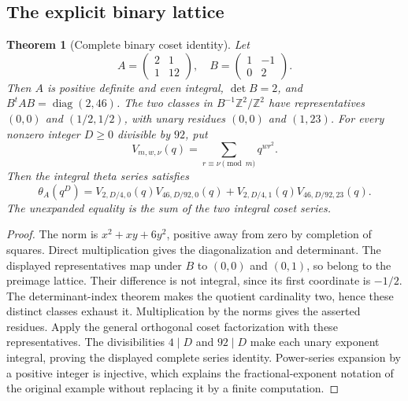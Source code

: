 \documentclass[11pt]{article}
\newtheorem{theorem}{Theorem}[section]
\theoremstyle{remark}\newtheorem{remark}[theorem]{Remark}
\begin{document}
\subsection{The explicit binary lattice}
\begin{theorem}[Complete binary coset identity]
Let
\[
 A=\begin{pmatrix}2&1\\1&12\end{pmatrix},\quad
 B=\begin{pmatrix}1&-1\\0&2\end{pmatrix}.
\]
Then $A$ is positive definite and even integral, $\det B=2$, and
$B^tAB=\operatorname{diag}(2,46)$. The two classes in
$B^{-1}\mathbb Z^2/\mathbb Z^2$ have representatives $(0,0)$ and
$(1/2,1/2)$, with unary residues $(0,0)$ and $(1,23)$.
For every nonzero integer $D\geq 0$ divisible by $92$, put
\[
 V_{m,w,\nu}(q)=\sum_{r\equiv\nu\pmod m}q^{wr^2}.
\]
Then the integral theta series satisfies
\[
 \theta_A(q^D)=V_{2,D/4,0}(q)V_{46,D/92,0}(q)
             +V_{2,D/4,1}(q)V_{46,D/92,23}(q).
\]
The unexpanded equality is the sum of the two integral coset series.
\end{theorem}
\begin{proof}
The norm is $x^2+xy+6y^2$, positive away from zero by completion of
squares. Direct multiplication gives the diagonalization and determinant.
The displayed representatives map under $B$ to $(0,0)$ and $(0,1)$,
so belong to the preimage lattice. Their difference is not integral,
since its first coordinate is $-1/2$. The determinant-index theorem
makes the quotient cardinality two, hence these distinct classes exhaust it.
Multiplication by the norms gives the asserted residues. Apply the general
orthogonal coset factorization with these representatives. The divisibilities
$4\mid D$ and $92\mid D$ make each unary exponent integral, proving the
displayed complete series identity. Power-series expansion by a positive
integer is injective, which explains the fractional-exponent notation of the
original example without replacing it by a finite computation.
\end{proof}
\end{document}
